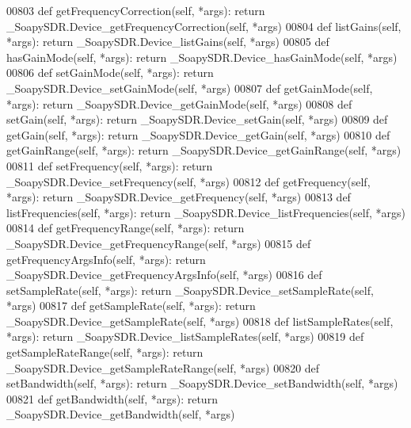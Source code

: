 \begin{DoxyCode}
{{{{{00803     \textcolor{keyword}{def }getFrequencyCorrection(self, *args): \textcolor{keywordflow}{return} \_SoapySDR.Device\_getFrequencyCorrection(self, *args)
00804     \textcolor{keyword}{def }listGains(self, *args): \textcolor{keywordflow}{return} \_SoapySDR.Device\_listGains(self, *args)
00805     \textcolor{keyword}{def }hasGainMode(self, *args): \textcolor{keywordflow}{return} \_SoapySDR.Device\_hasGainMode(self, *args)
00806     \textcolor{keyword}{def }setGainMode(self, *args): \textcolor{keywordflow}{return} \_SoapySDR.Device\_setGainMode(self, *args)
00807     \textcolor{keyword}{def }getGainMode(self, *args): \textcolor{keywordflow}{return} \_SoapySDR.Device\_getGainMode(self, *args)
00808     \textcolor{keyword}{def }setGain(self, *args): \textcolor{keywordflow}{return} \_SoapySDR.Device\_setGain(self, *args)
00809     \textcolor{keyword}{def }getGain(self, *args): \textcolor{keywordflow}{return} \_SoapySDR.Device\_getGain(self, *args)
00810     \textcolor{keyword}{def }getGainRange(self, *args): \textcolor{keywordflow}{return} \_SoapySDR.Device\_getGainRange(self, *args)
00811     \textcolor{keyword}{def }setFrequency(self, *args): \textcolor{keywordflow}{return} \_SoapySDR.Device\_setFrequency(self, *args)
00812     \textcolor{keyword}{def }getFrequency(self, *args): \textcolor{keywordflow}{return} \_SoapySDR.Device\_getFrequency(self, *args)
00813     \textcolor{keyword}{def }listFrequencies(self, *args): \textcolor{keywordflow}{return} \_SoapySDR.Device\_listFrequencies(self, *args)
00814     \textcolor{keyword}{def }getFrequencyRange(self, *args): \textcolor{keywordflow}{return} \_SoapySDR.Device\_getFrequencyRange(self, *args)
00815     \textcolor{keyword}{def }getFrequencyArgsInfo(self, *args): \textcolor{keywordflow}{return} \_SoapySDR.Device\_getFrequencyArgsInfo(self, *args)
00816     \textcolor{keyword}{def }setSampleRate(self, *args): \textcolor{keywordflow}{return} \_SoapySDR.Device\_setSampleRate(self, *args)
00817     \textcolor{keyword}{def }getSampleRate(self, *args): \textcolor{keywordflow}{return} \_SoapySDR.Device\_getSampleRate(self, *args)
00818     \textcolor{keyword}{def }listSampleRates(self, *args): \textcolor{keywordflow}{return} \_SoapySDR.Device\_listSampleRates(self, *args)
00819     \textcolor{keyword}{def }getSampleRateRange(self, *args): \textcolor{keywordflow}{return} \_SoapySDR.Device\_getSampleRateRange(self, *args)
00820     \textcolor{keyword}{def }setBandwidth(self, *args): \textcolor{keywordflow}{return} \_SoapySDR.Device\_setBandwidth(self, *args)
00821     \textcolor{keyword}{def }getBandwidth(self, *args): \textcolor{keywordflow}{return} \_SoapySDR.Device\_getBandwidth(self, *args)
}}}}}
\end{DoxyCode}
